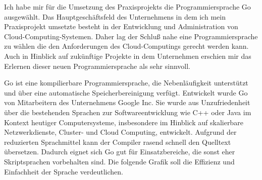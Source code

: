 \documentclass[12pt]{article}
\begin{document}
Ich habe mir für die Umsetzung des Praxisprojekts die Programmiersprache Go \cite{GOLANG} ausgewählt.
Das Hauptgeschäftsfeld des Unternehmens in dem ich mein Praxisprojekt umsetzte besteht in der Entwicklung und Administration von Cloud-Computing-Systemen. Daher lag der Schluß nahe eine Programmiersprache zu wählen die den Anforderungen des Cloud-Computings gerecht werden kann. Auch in Hinblick auf zukünftige Projekte in dem Unternehmen erschien mir das Erlernen dieser neuen Programmiersprache als sehr sinnvoll.

Go ist eine kompilierbare Programmiersprache, die Nebenläufigkeit unterstützt und über eine automatische Speicherbereinigung verfügt. Entwickelt wurde Go von Mitarbeitern des Unternehmens Google Inc. Sie wurde aus Unzufriedenheit über die bestehenden Sprachen zur Softwareentwicklung wie C++ oder Java im Kontext heutiger Computersysteme, insbesondere im Hinblick auf skalierbare Netzwerkdienste, Cluster- und Cloud Computing, entwickelt. Aufgrund der reduzierten Sprachmittel kann der Compiler rasend schnell den Quelltext übersetzen. Dadurch eignet sich Go gut für Einsatzbereiche, die sonst eher Skriptsprachen vorbehalten sind. Die folgende Grafik soll die Effizienz und Einfachheit der Sprache verdeutlichen.


\end{document}
